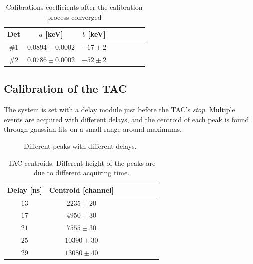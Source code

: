 \documentclass[11pt,a4 paper]{article}
\begin{document}
\begin{table}[H]
  \centering
  \begin{tabular}{cccccccc}
    \toprule
    Det & $a$ [keV] & $b$ [keV] \\
    \midrule
    \#1 & $0.0894 \pm 0.0002$ & $-17 \pm 2$ \\
    \#2 & $0.0786 \pm 0.0002$ & $-52 \pm 2$ \\
    \bottomrule
  \end{tabular}
  \caption{Calibrations coefficients after the calibration process converged}
  \label{tab:calibr:coeffs}
\end{table}

%

\subsection{Calibration of the TAC}

The system is set with a delay module just before the TAC's \emph{stop}. Multiple events are acquired with different delays, and the centroid of each peak is found through gaussian fits on a small range around maximums.

\begin{figure}[H]
    \centering
    \caption{Different peaks with different delays.}
    \label{fig:tac:calibr}
\end{figure}

\begin{table}[H]
    \centering
    \begin{tabular}{cccccccc}
        \toprule
        Delay [ns] & Centroid [channel] \\
        \midrule
        $13$ & $2235\pm 20$ \\
        $17$ & $4950\pm 30$ \\
        $21$ & $7555\pm 30$ \\
        $25$ & $10390\pm 30$ \\
        $29$ & $13080\pm 40$ \\
        \bottomrule
    \end{tabular}
    \caption{TAC centroids. Different height of the peaks are due to different acquiring time.}
    \label{tab:tac:calibr}
\end{table}
\end{document}
